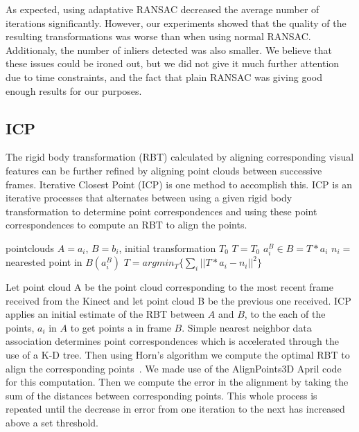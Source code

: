 \documentclass[letterpaper, 10pt, conference]{ieeeconf}
\begin{document}
As expected, using adaptative RANSAC decreased the average number of iterations significantly.
However, our experiments showed that the quality of the resulting transformations was worse
than when using normal RANSAC. Additionaly, the number of inliers detected was also smaller.
We believe that these issues could be ironed out, but we did not give it much further attention
due to time constraints, and the fact that plain RANSAC was giving good enough results
for our purposes.

\subsection{ICP}
	The rigid body transformation (RBT) calculated by aligning corresponding visual features can be further refined by aligning point clouds between successive frames.  Iterative Closest Point (ICP) is one method to accomplish this.  ICP is an iterative processes that alternates between using a given rigid body transformation to determine point correspondences and using these point correspondences to compute an RBT to align the points.  \newline

\begin{algorithm}
\begin{algorithmic}
\REQUIRE pointclouds $A = a_{i}$, $B = b_{i} $, initial transformation $T_{0}$
\STATE $T = T_{0}$
\STATE $a^{B}_{i} \in B = T * a_i$
\STATE $n_{i} =$ nearested point in $B(a^{B}_{i})$
\ENDFOR
\STATE $T = argmin_{T} \{\sum_{i} ||T * a_{i} - n_{i} ||^2\}$
\ENDWHILE
\end{algorithmic}
\end{algorithm}

	Let point cloud A be the point cloud corresponding to the most recent frame received from the Kinect and let point cloud B be the previous one received.  ICP applies an initial estimate of the RBT between $A$ and $B$, to the each of the points, $a_{i}$ in $A$ to get points a in frame $B$.  Simple nearest neighbor data association determines point correspondences which is accelerated through the use of a K-D tree.  Then using Horn's algorithm we compute the optimal RBT to align the corresponding points~\cite{horn1987closed}.  We made use of the AlignPoints3D April code for this computation.  Then we compute the error in the alignment by taking the sum of the distances between corresponding points.  This whole process is repeated until the decrease in error from one iteration to the next has increased above a set threshold.
\end{document}
